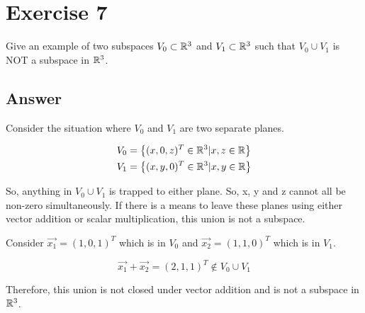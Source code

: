 \section*{Exercise 7}

Give an example of two subspaces $V_0 \subset \mathbb{R}^3$ and $V_1 \subset \mathbb{R}^3$ such that $V_0 \cup V_1$ is NOT a subspace in $\mathbb{R}^3$.

\subsection*{Answer}

Consider the situation where $V_0$ and $V_1$ are two separate planes. 

\[
	\begin{aligned}
		V_0 &= \left\{ (x,0,z)^T \in \mathbb{R}^3 | x,z \in \mathbb{R} \right\} \\
		V_1 &= \left\{ (x,y,0)^T \in \mathbb{R}^3 | x,y \in \mathbb{R} \right\} 
	\end{aligned}
\]

So, anything in $V_0 \cup V_1$ is trapped to either plane. So, x, y and z cannot all be non-zero simultaneously. If there is a means to leave these planes using either vector addition or scalar multiplication, this union is not a subspace. 

Consider $\vec{x_1} = (1,0,1)^T$ which is in $V_0$ and $\vec{x_2} = (1,1,0)^T$ which is in $V_1$. 

\[\vec{x_1} + \vec{x_2} = (2,1,1)^T \notin V_0 \cup V_1\]

Therefore, this union is not closed under vector addition and is not a subspace in $\mathbb{R}^3$.
